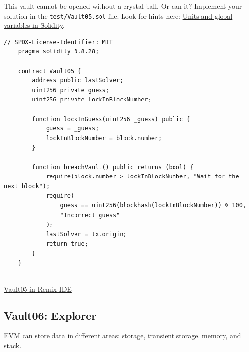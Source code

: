 \documentclass[12pt]{article}
\begin{document}
This vault cannot be opened without a crystal ball. Or can it? Implement your solution in the \texttt{test/Vault05.sol} file. Look for hints here: \href{https://docs.soliditylang.org/en/latest/units-and-global-variables.html}{Units and global variables in Solidity}.

\begin{lstlisting}[language=Solidity]
    // SPDX-License-Identifier: MIT
    pragma solidity 0.8.28;
    
    contract Vault05 {
        address public lastSolver;
        uint256 private guess;
        uint256 private lockInBlockNumber;
    
        function lockInGuess(uint256 _guess) public {
            guess = _guess;
            lockInBlockNumber = block.number;
        }
    
        function breachVault() public returns (bool) {
            require(block.number > lockInBlockNumber, "Wait for the next block");
            require(
                guess == uint256(blockhash(lockInBlockNumber)) % 100,
                "Incorrect guess"
            );
            lastSolver = tx.origin;
            return true;
        }
    }
    
\end{lstlisting}

\medskip
\noindent
\href{https://remix.ethereum.org/?#activate=solidity&url=https://github.com/radovluk/unbreakable-vault/contracts/Vault05.sol&lang=en&optimize=false&runs=200&evmVersion=null&version=soljson-v0.8.28+commit.7893614a.js}{Vault05 in Remix IDE}

\subsection*{Vault06: Explorer}

EVM can store data in different areas: storage, transient storage, memory, and stack.
\end{document}
